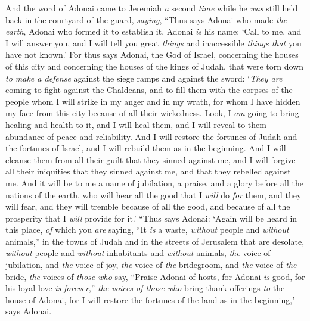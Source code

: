 \begin{biblechapter} %
 And the word of Adonai came to Jeremiah \textit{a} second \textit{time} while he \textit{was} still held back in the courtyard of the guard, \textit{saying},
\verse “Thus says Adonai who made \textit{the earth}, Adonai who formed it to establish it, Adonai \textit{is} his name:
\verse ‘Call to me, and I will answer you, and I will tell you great \textit{things} and inaccessible \textit{things that} you have not known.’
\verse For thus says Adonai, the God of Israel, concerning the houses of this city and concerning the houses of the kings of Judah, that were torn down \textit{to make a defense} against the siege ramps and against the sword:
\verse ‘\textit{They are} coming to fight against the Chaldeans, and to fill them with the corpses of the people whom I will strike in my anger and in my wrath, for whom I have hidden my face from this city because of all their wickedness.
\verse Look, I \textit{am} going to bring healing and health to it, and I will heal them, and I will reveal to them abundance of peace and reliability.
\verse And I will restore the fortunes of Judah and the fortunes of Israel, and I will rebuild them as in the beginning.
\verse And I will cleanse them from all their guilt that they sinned against me, and I will forgive all their iniquities that they sinned against me, and that they rebelled against me.
\verse And it will be to me a name of jubilation, a praise, and a glory before all the nations of the earth, who will hear all the good that I \textit{will} do \textit{for} them, and they will fear, and they will tremble because of all the good, and because of all the prosperity that I \textit{will} provide for it.’
\verse “Thus says Adonai: ‘Again will be heard in this place, \textit{of} which you \textit{are} saying, “It \textit{is} a waste, \textit{without} people and \textit{without} animals,” in the towns of Judah and in the streets of Jerusalem that are desolate, \textit{without} people and \textit{without} inhabitants and \textit{without} animals,
\verse \textit{the} voice of jubilation, and \textit{the} voice of joy, \textit{the} voice of \textit{the} bridegroom, and \textit{the} voice of \textit{the} bride, \textit{the} voices of \textit{those who} say, “Praise Adonai of hosts, for Adonai \textit{is} good, for his loyal love \textit{is} \textit{forever},” \textit{the voices of those who} bring thank offerings \textit{to} the house of Adonai, for I will restore the fortunes of the land as in the beginning,’ says Adonai.

\end{biblechapter}

